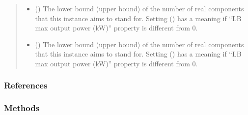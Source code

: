 \documentclass[letterpaper,10pt,english]{sphinxmanual}
\begin{document}
\begin{fulllineitems}
\begin{fulllineitems}
\begin{quote}
\begin{description}
\begin{itemize}
\item {} 
\sphinxAtStartPar
{} (\sphinxstyleliteralemphasis{\sphinxupquote{, }}\sphinxstyleliteralemphasis{\sphinxupquote{, }}) \textendash{} The lower bound (upper bound) of the number of real components that this instance aims to stand for.
Setting  () has a meaning if “LB max output power (kW)” property is
different from 0.

\item {} 
\sphinxAtStartPar
{} (\sphinxstyleliteralemphasis{\sphinxupquote{, }}\sphinxstyleliteralemphasis{\sphinxupquote{, }}) \textendash{} The lower bound (upper bound) of the number of real components that this instance aims to stand for.
Setting  () has a meaning if “LB max output power (kW)” property is
different from 0.

\end{itemize}

\end{description}\end{quote}
\subsubsection*{References}

\end{fulllineitems}

\subsubsection*{Methods}


\begin{savenotes}\sphinxattablestart
\centering
\begin{tabulary}{\linewidth}[t]{}
\hline


\end{tabulary}
\end{savenotes}
\end{fulllineitems}
\end{document}
